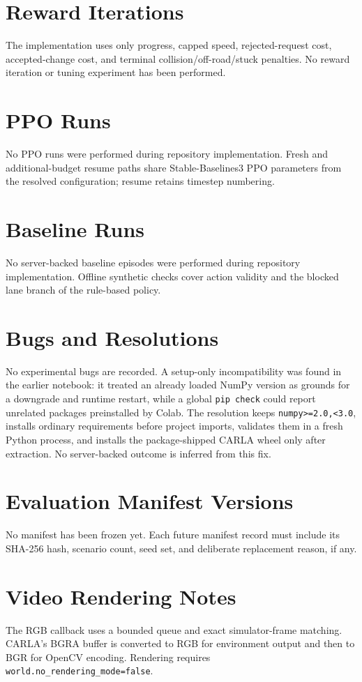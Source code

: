 \documentclass[10pt]{article}
\begin{document}
\section{Reward Iterations}
The implementation uses only progress, capped speed, rejected-request cost,
accepted-change cost, and terminal collision/off-road/stuck penalties. No
reward iteration or tuning experiment has been performed.

\section{PPO Runs}
No PPO runs were performed during repository implementation. Fresh and
additional-budget resume paths share Stable-Baselines3 PPO parameters from the
resolved configuration; resume retains timestep numbering.

\section{Baseline Runs}
No server-backed baseline episodes were performed during repository
implementation. Offline synthetic checks cover action validity and the blocked
lane branch of the rule-based policy.

\section{Bugs and Resolutions}
No experimental bugs are recorded. A setup-only incompatibility was found in
the earlier notebook: it treated an already loaded NumPy version as grounds for
a downgrade and runtime restart, while a global \texttt{pip check} could report
unrelated packages preinstalled by Colab. The resolution keeps
\texttt{numpy>=2.0,<3.0}, installs ordinary requirements before project
imports, validates them in a fresh Python process, and installs the
package-shipped CARLA wheel only after extraction. No server-backed outcome is
inferred from this fix.

\section{Evaluation Manifest Versions}
No manifest has been frozen yet. Each future manifest record must include its
SHA-256 hash, scenario count, seed set, and deliberate replacement reason, if
any.

\section{Video Rendering Notes}
The RGB callback uses a bounded queue and exact simulator-frame matching.
CARLA's BGRA buffer is converted to RGB for environment output and then to BGR
for OpenCV encoding. Rendering requires
\texttt{world.no\_rendering\_mode=false}.
\end{document}
